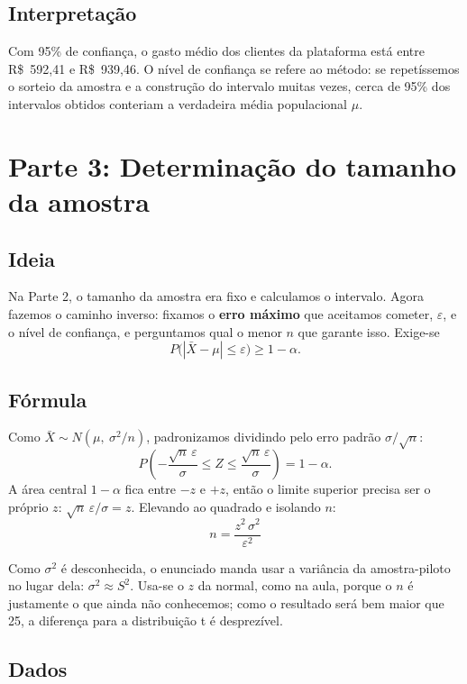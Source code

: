 \documentclass[12pt,a4paper]{article}
\begin{document}
\subsection*{Interpretação}

Com 95\% de confiança, o gasto médio dos clientes da plataforma está entre R\$~592{,}41 e R\$~939,46. O nível de confiança se refere ao método: se repetíssemos o sorteio da amostra e a construção do intervalo muitas vezes, cerca de 95\% dos intervalos obtidos conteriam a verdadeira média populacional $\mu$.

\section{Parte 3: Determinação do tamanho da amostra}

\subsection*{Ideia}

Na Parte 2, o tamanho da amostra era fixo e calculamos o intervalo. Agora fazemos o caminho inverso: fixamos o \textbf{erro máximo} que aceitamos cometer, $\varepsilon$, e o nível de confiança, e perguntamos qual o menor $n$ que garante isso. Exige-se
$$P\big(|\bar{X} - \mu| \le \varepsilon\big) \ge 1-\alpha.$$

\subsection*{Fórmula}

Como $\bar{X} \sim N(\mu,\ \sigma^2/n)$, padronizamos dividindo pelo erro padrão $\sigma/\sqrt{n}$:
$$P\left(-\frac{\sqrt{n}\,\varepsilon}{\sigma} \le Z \le \frac{\sqrt{n}\,\varepsilon}{\sigma}\right) = 1-\alpha .$$
A área central $1-\alpha$ fica entre $-z$ e $+z$, então o limite superior precisa ser o próprio $z$: $\sqrt{n}\,\varepsilon/\sigma = z$. Elevando ao quadrado e isolando $n$:
$$\boxed{\,n = \frac{z^2\,\sigma^2}{\varepsilon^2}\,}$$

Como $\sigma^2$ é desconhecida, o enunciado manda usar a variância da amostra-piloto no lugar dela: $\sigma^2 \approx S^2$. Usa-se o $z$ da normal, como na aula, porque o $n$ é justamente o que ainda não conhecemos; como o resultado será bem maior que 25, a diferença para a distribuição t é desprezível.

\subsection*{Dados}
\end{document}
